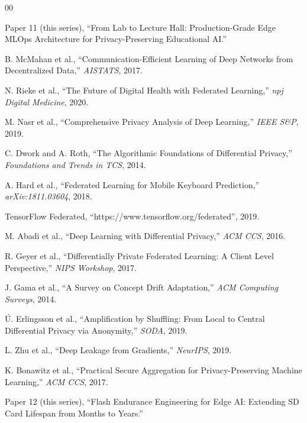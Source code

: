 \documentclass[conference]{IEEEtran}
\begin{document}
\begin{thebibliography}{00}

 Paper 11 (this series), ``From Lab to Lecture Hall: Production-Grade Edge MLOps Architecture for Privacy-Preserving Educational AI.''

 B. McMahan et al., ``Communication-Efficient Learning of Deep Networks from Decentralized Data,'' \textit{AISTATS}, 2017.

 N. Rieke et al., ``The Future of Digital Health with Federated Learning,'' \textit{npj Digital Medicine}, 2020.

 M. Nasr et al., ``Comprehensive Privacy Analysis of Deep Learning,'' \textit{IEEE S\&P}, 2019.

 C. Dwork and A. Roth, ``The Algorithmic Foundations of Differential Privacy,'' \textit{Foundations and Trends in TCS}, 2014.

 A. Hard et al., ``Federated Learning for Mobile Keyboard Prediction,'' \textit{arXiv:1811.03604}, 2018.

 TensorFlow Federated, ``https://www.tensorflow.org/federated'', 2019.

 M. Abadi et al., ``Deep Learning with Differential Privacy,'' \textit{ACM CCS}, 2016.

 R. Geyer et al., ``Differentially Private Federated Learning: A Client Level Perspective,'' \textit{NIPS Workshop}, 2017.

 J. Gama et al., ``A Survey on Concept Drift Adaptation,'' \textit{ACM Computing Surveys}, 2014.

 Ú. Erlingsson et al., ``Amplification by Shuffling: From Local to Central Differential Privacy via Anonymity,'' \textit{SODA}, 2019.

 L. Zhu et al., ``Deep Leakage from Gradients,'' \textit{NeurIPS}, 2019.

 K. Bonawitz et al., ``Practical Secure Aggregation for Privacy-Preserving Machine Learning,'' \textit{ACM CCS}, 2017.

 Paper 12 (this series), ``Flash Endurance Engineering for Edge AI: Extending SD Card Lifespan from Months to Years.''

\end{thebibliography}
\end{document}
